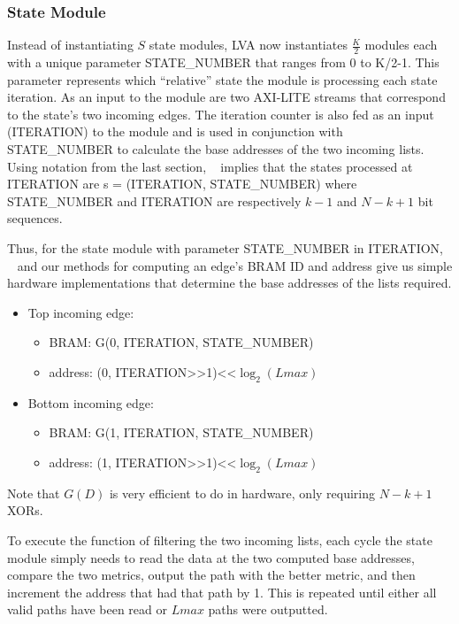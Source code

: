 \subsubsection{State Module}

Instead of instantiating $S$ state modules, LVA now instantiates $\frac{K}{2}$ modules each with a unique parameter STATE\_NUMBER that ranges from 0 to K/2-1. This parameter represents which “relative” state the module is processing each state iteration. As an input to the module are two AXI-LITE streams that correspond to the state’s two incoming edges. The iteration counter is also fed as an input (ITERATION) to the module and is used in conjunction with STATE\_NUMBER to calculate the base addresses of the two incoming lists. 
Using notation from the last section, \Lemma~ implies that the states processed at ITERATION are s = (ITERATION, STATE\_NUMBER) where STATE\_NUMBER and ITERATION are respectively $k-1$ and $N-k+1$ bit sequences.

Thus, for the state module with parameter STATE\_NUMBER in ITERATION, \Lemma~ and our methods for computing an edge’s BRAM ID and address give us simple hardware implementations that determine the base addresses of the lists required.

\begin{itemize}
    \item Top incoming edge:
    \begin{itemize}
        \item BRAM: G({0, ITERATION, STATE_NUMBER})
        \item address: (0, ITERATION>>1)<<$\log_2(Lmax)$
    \end{itemize}
    \item Bottom incoming edge:
        \begin{itemize}
        \item BRAM: G({1, ITERATION, STATE_NUMBER})
        \item address: (1, ITERATION>>1)<<$\log_2(Lmax)$
    \end{itemize}
\end{itemize}

Note that $G(D)$ is very efficient to do in hardware, only requiring $N-k+1$ XORs.

To execute the function of filtering the two incoming lists, each cycle the state module simply needs to read the data at the two computed base addresses, compare the two metrics, output the path with the better metric, and then increment the address that had that path by 1. This is repeated until either all valid paths have been read or $Lmax$ paths were outputted.


